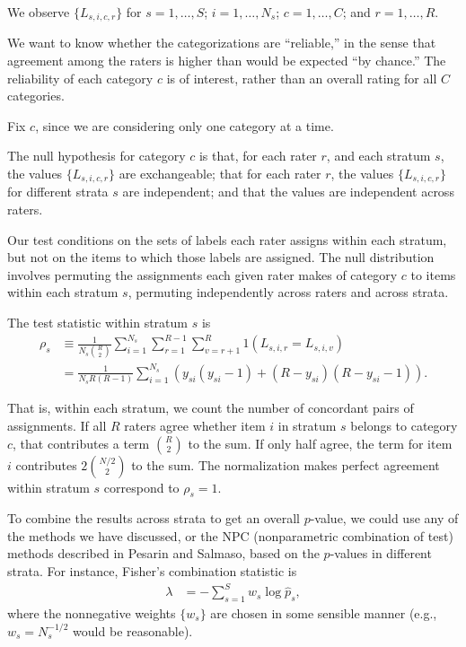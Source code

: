 \documentclass[]{article}
\begin{document}
We observe $\{ L_{s,i,c,r} \}$ for $s=1, \dots, S$;  $i=1, \dots, N_s$;
$c=1, \dots, C$; and $r=1, \dots, R$.

We want to know whether the categorizations are ``reliable,'' in the sense that
agreement among the raters is higher than would be expected ``by chance.''
The reliability of each category $c$ is of interest, rather than an overall
rating for all $C$ categories.

Fix $c$, since we are considering only one category at a time.

The null hypothesis for category $c$ is that, for each rater $r$, and each
stratum $s$, the values $\{ L_{s,i,c,r} \}$ are exchangeable; that for each
rater $r$, the values $\{ L_{s,i,c,r} \}$ for different strata $s$ are
independent; and that the values are independent across raters.

Our test conditions on the sets of labels each rater assigns within each
stratum, but not on the items to which those labels are assigned.
The null distribution involves permuting the assignments each given rater makes
of category $c$ to items within each stratum $s$, permuting independently
across raters and across strata.

The test statistic within stratum $s$ is
\begin{align*}
\rho_s &\equiv \frac{1}{N_s {R \choose 2}} \sum_{i=1}^{N_s}
              \sum_{r=1}^{R-1} \sum_{v=r+1}^R 1(L_{s,i,r} = L_{s,i,v}) \\
              &= \frac{1}{N_s R(R-1)} \sum_{i=1}^{N_s}
                (y_{si}(y_{si}-1) + (R-y_{si})(R-y_{si}-1)).
\end{align*}

That is, within each stratum, we count the number of concordant pairs of
assignments.
If all $R$ raters agree whether item $i$ in stratum $s$ belongs to category
$c$, that contributes a term ${R \choose 2}$ to the sum.
If only half agree, the term for item $i$ contributes $2 {N/2 \choose 2}$ to
the sum.
The normalization makes perfect agreement within stratum $s$ correspond to
$\rho_s = 1$.

To combine the results across strata to get an overall $p$-value, we could
use any of the methods we have discussed, or the NPC (nonparametric
combination of test) methods described in Pesarin and Salmaso, based on
the $p$-values in different strata.
For instance, Fisher's combination statistic is
\begin{align*}
\lambda &= - \sum_{s=1}^S w_s \log \hat{p}_s,
\end{align*}
where the nonnegative weights $\{w_s\}$ are chosen in some sensible manner
(e.g., $w_s = N_s^{-1/2}$ would be reasonable).
\end{document}
